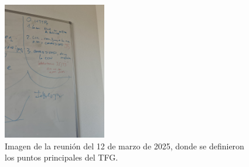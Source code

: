 \documentclass[a4paper, 12pt]{book}
\begin{document}
\begin{figure}[H]
    \centering
    \includegraphics[width=0.4\textwidth]{img/reunion_2025-03-12.png}
    \caption{Imagen de la reunión del 12 de marzo de 2025, donde se definieron los puntos principales del TFG.}
    \label{fig:reunion-marzo}
\end{figure}
\end{document}
